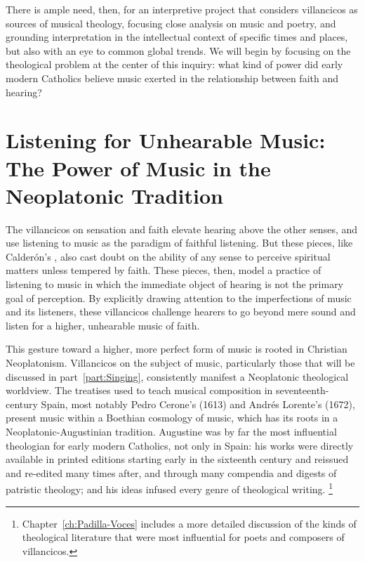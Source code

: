 There is ample need, then, for an interpretive project that considers villancicos as sources of musical theology, focusing close analysis on music and poetry, and grounding interpretation in the intellectual context of specific times and places, but also with an eye to common global trends.
We will begin by focusing on the theological problem at the center of this inquiry: what kind of power did early modern Catholics believe music exerted in the relationship between faith and hearing?

\section{%
Listening for Unhearable Music:
The Power of Music in the Neoplatonic Tradition
}

The villancicos on sensation and faith elevate hearing above the other senses, and use listening to music as the paradigm of faithful listening.
But these pieces, like Calderón's , also cast doubt on the ability of any sense to perceive spiritual matters unless tempered by faith.
These pieces, then, model a practice of listening to music in which the immediate object of hearing is not the primary goal of perception.
By explicitly drawing attention to the imperfections of music and its listeners, these villancicos challenge hearers to go beyond mere sound and listen for a higher, unhearable music of faith.

This gesture toward a higher, more perfect form of music is rooted in Christian Neoplatonism.
Villancicos on the subject of music, particularly those that will be discussed in part~\ref{part:Singing}, consistently manifest a Neoplatonic theological worldview.
The treatises used to teach musical composition in seventeenth-century Spain, most notably Pedro Cerone's  (1613) and Andrés Lorente's  (1672), present music within a Boethian cosmology of music, which has its roots in a Neoplatonic-Augustinian tradition.
Augustine was by far the most influential theologian for early modern Catholics, not only in Spain: his works were directly available in printed editions starting early in the sixteenth century and reissued and re-edited many times after, and through many compendia and digests of patristic theology; and his ideas infused every genre of theological writing.%
	\footnote{%
	Chapter~\ref{ch:Padilla-Voces} includes a more detailed discussion of the kinds of theological literature that were most influential for poets and composers of villancicos.
	}

